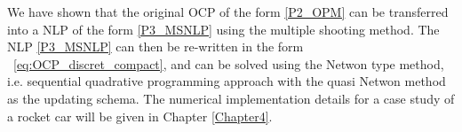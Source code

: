 \documentclass  [
  paper    = a4,
  BCOR     = 10mm,
  twoside,
  fontsize = 12pt,
  fleqn,
  toc      = bibnumbered,
  toc      = listofnumbered,
  numbers  = noendperiod,
  headings = normal,
  listof   = leveldown,
  version  = 3.03
]                                       {scrreprt}
\newcommand{\<}{\langle}
\renewcommand{\>}{\rangle}
\begin{document}


We have shown that the original OCP of the form \ref{P2_OPM} can be transferred into a NLP of the form \ref{P3_MSNLP} using the multiple shooting method. The NLP \ref{P3_MSNLP} can then be re-written in the form  \ref{eq:OCP_discret_compact}, and can be solved using the Netwon type method, i.e. sequential quadrative programming approach with the quasi Netwon method as the updating schema. The numerical implementation details for a case study of a rocket car will be given in Chapter \ref{Chapter4}.
		
\end{document}
